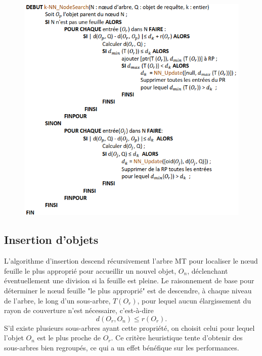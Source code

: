 \begin{figure}[H]
	\centering
	\includegraphics[width=.9 \textwidth]{Figures/knnnodesearch.png} %
\end{figure} 

\subsection{Insertion d'objets}
L'algorithme d'insertion descend récursivement l'arbre MT pour localiser le nœud feuille le plus approprié pour accueillir un nouvel objet, $ O_n $, déclenchant éventuellement une division si la feuille est pleine. Le raisonnement de base pour déterminer le nœud feuille "le plus approprié" est de descendre, à chaque niveau de l'arbre, le long d'un sous-arbre, $ T(O_r) $, pour lequel aucun élargissement du rayon de couverture n'est nécessaire, c'est-à-dire  \begin{displaymath}
	 d(O_r, O_n) \le r(O_r).
\end{displaymath}  S'il existe plusieurs sous-arbres ayant cette propriété, on choisit celui pour lequel l'objet $ O_n $ est le plus proche de $ O_r $. Ce critère heuristique tente d'obtenir des sous-arbres bien regroupés, ce qui a un effet bénéfique sur les performances.\\

